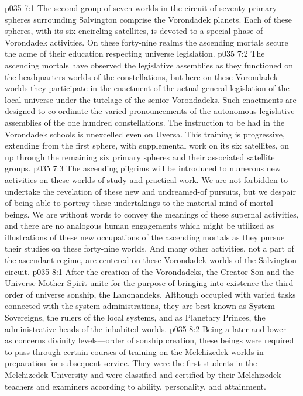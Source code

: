 %
\vs p035 7:1 The second group of seven worlds in the circuit of seventy primary spheres surrounding Salvington comprise the Vorondadek planets. Each of these spheres, with its six encircling satellites, is devoted to a special phase of Vorondadek activities. On these forty\hyp{}nine realms the ascending mortals secure the acme of their education respecting universe legislation.
\vs p035 7:2 The ascending mortals have observed the legislative assemblies as they functioned on the headquarters worlds of the constellations, but here on these Vorondadek worlds they participate in the enactment of the actual general legislation of the local universe under the tutelage of the senior Vorondadeks. Such enactments are designed to co\hyp{}ordinate the varied pronouncements of the autonomous legislative assemblies of the one hundred constellations. The instruction to be had in the Vorondadek schools is unexcelled even on Uversa. This training is progressive, extending from the first sphere, with supplemental work on its six satellites, on up through the remaining six primary spheres and their associated satellite groups.
\vs p035 7:3 The ascending pilgrims will be introduced to numerous new activities on these worlds of study and practical work. We are not forbidden to undertake the revelation of these new and undreamed\hyp{}of pursuits, but we despair of being able to portray these undertakings to the material mind of mortal beings. We are without words to convey the meanings of these supernal activities, and there are no analogous human engagements which might be utilized as illustrations of these new occupations of the ascending mortals as they pursue their studies on these forty\hyp{}nine worlds. And many other activities, not a part of the ascendant regime, are centered on these Vorondadek worlds of the Salvington circuit.
\vs p035 8:1 After the creation of the Vorondadeks, the Creator Son and the Universe Mother Spirit unite for the purpose of bringing into existence the third order of universe sonship, the Lanonandeks. Although occupied with varied tasks connected with the system administrations, they are best known as System Sovereigns, the rulers of the local systems, and as Planetary Princes, the administrative heads of the inhabited worlds.
\vs p035 8:2 Being a later and lower---as concerns divinity levels---order of sonship creation, these beings were required to pass through certain courses of training on the Melchizedek worlds in preparation for subsequent service. They were the first students in the Melchizedek University and were classified and certified by their Melchizedek teachers and examiners according to ability, personality, and attainment.
